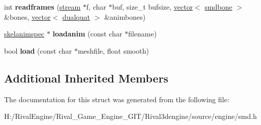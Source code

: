\begin{DoxyCompactItemize}
\item 
\mbox{\label{structsmd_1_1smdmeshgroup_ad9f42362953cabd4833b13fdb8199051}} 
int {\bfseries readframes} (\hyperlink{structstream}{stream} $\ast$f, char $\ast$buf, size\+\_\+t bufsize, \hyperlink{structvector}{vector}$<$ \hyperlink{structsmdbone}{smdbone} $>$ \&bones, \hyperlink{structvector}{vector}$<$ \hyperlink{structdualquat}{dualquat} $>$ \&animbones)
\item 
\mbox{\label{structsmd_1_1smdmeshgroup_a21d59cdf537f3ab56843442040c5bf1f}} 
\hyperlink{structskelmodel_1_1skelanimspec}{skelanimspec} $\ast$ {\bfseries loadanim} (const char $\ast$filename)
\item 
\mbox{\label{structsmd_1_1smdmeshgroup_a64a1ad7facd06e682368a54b8e9051c9}} 
bool {\bfseries load} (const char $\ast$meshfile, float smooth)
\end{DoxyCompactItemize}
\subsection*{Additional Inherited Members}


The documentation for this struct was generated from the following file\+:\begin{DoxyCompactItemize}
\item 
H\+:/\+Rival\+Engine/\+Rival\+\_\+\+Game\+\_\+\+Engine\+\_\+\+G\+I\+T/\+Rival3dengine/source/engine/smd.\+h\end{DoxyCompactItemize}
